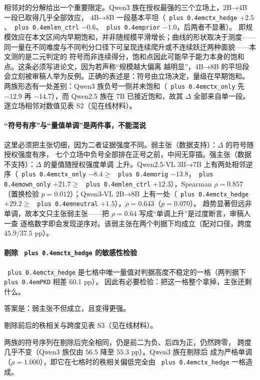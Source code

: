 \documentclass[10.5pt,compsoc,UTF8]{CjC}
\theoremstyle{mystyle}
\DeclareRobustCommand{\code}[1]{\texttt{\spaceskip=0pt plus 0.4em\relax#1}}
\begin{document}
相邻对的分解给出一个重要限定。Qwen3 族在授权最强的三个立场上，2B→4B 一段已取得几乎全部效应，
4B→8B 一段基本平坦（\code{ctx\_hedge} $+2.5$、\code{len\_ctrl} $-0.6$、\code{prior} $-1.0$，后两者不显著）。
即规模效应在本文区间内早期饱和，并非随规模平滑增长；曲线的形状取决于测度——同一量在不同难度与不同判分口径下可呈现连续爬升或不连续跃迁两种面貌\cite{ref26,ref27}——本文测的是二元判定的
符号而非连续得分，饱和点因此可能早于能力本身的饱和点。这条必须写进论文，因为若声称“规模越大偏离
越明显”，4B→8B 的平坦段会立刻被审稿人举为反例。正确的表述是：符号由立场决定，量级在早期饱和。
两族形态有一处差别：Qwen3 族负号一侧并未饱和（\code{ctx\_only} 先 $-12.9$ 再 $-14.7$），而 Qwen2.5 族在
7B 已接近饱和，故其 $\Delta$ 全部来自单一段。逐立场相邻对数值见表 S2（见在线材料）。

\paragraph{“符号有序”与“量值单调”是两件事，不能混说}
\label{sec:4-2-3-3}

这里必须把主张切细，因为二者证据强度不同。弱主张（数据支持）：$\Delta$ 的符号随授权强度有序，
七个立场中负号全部排在正号之前，中间无穿插。强主张（数据不支持）：$\Delta$ 的量值随授权强度单调
上升。Qwen2.5-VL 3B→7B 上有两处相邻逆序（\code{ctx\_only} $-8.4 \ge$ \code{orig} $-13.8$，\code{own\_only}
$+21.7 \ge$ \code{len\_ctrl} $+12.3$），Spearman $\rho = 0.857$（置换检验 $p = 0.012$）；Qwen3-VL
2B→8B 上有一处（\code{ctx\_hedge} $+29.2 \ge$ \code{neutral} $+1.5$），$\rho = 0.643$（$p = 0.070$）。
趋势显著但远非单调，故本文只主张弱主张——把 $\rho = 0.64$ 写成“单调上升”是过度断言，审稿人一查
逐格数字即会发现逆序对。该弱主张在两个判据下均成立（配对口径，跨度 $45.9$/$37.5$ pp）。

\paragraph{剔除 \code{ctx\_hedge} 的敏感性检验}
\label{sec:4-2-3-4}

\code{ctx\_hedge} 是七格中唯一量值对判据高度不稳定的一格（两判据下 \code{PKD} 相差 60.1 pp），
因此有必要检验：把这一格整个拿掉，主张还剩什么。

答案是：弱主张不但成立，且变得更强。

剔除前后的秩相关与跨度见表 S3（见在线材料）。

两族的符号序列在剔除后完全相同，仍是前二为负、后四为正，仍然跨零，
跨度几乎不变（Qwen3 族仅由 $56.5$ 降至 $55.3$ pp）。Qwen3 族在剔除后
成为严格单调（$\rho = 1.000$），即它在七格时的秩相关偏低完全由
\code{ctx\_hedge} 一格造成。
\end{document}
